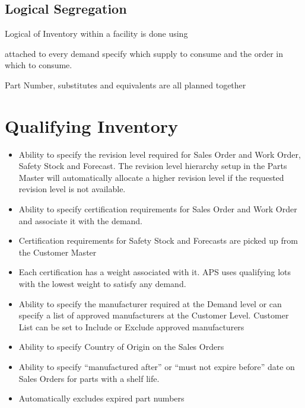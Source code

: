 \documentclass[letterpaper,10pt,english]{sphinxmanual}
\begin{document}
\subsection{Logical Segregation}
\label{\detokenize{index:logical-segregation}}
Logical of Inventory within a facility is done using 

 attached to every demand specify which supply to consume
and the order in which to consume.

Part Number, substitutes and equivalents are all planned together


\section{Qualifying Inventory}
\label{\detokenize{index:qualifying-inventory}}\begin{itemize}
\item {} 
Ability to specify the revision level required for Sales Order and
Work Order, Safety Stock and Forecast. The revision level hierarchy
setup in the Parts Master will automatically allocate a higher
revision level if the requested revision level is not available.

\item {} 
Ability to specify certification requirements for Sales Order and
Work Order and associate it with the demand.

\item {} 
Certification requirements for Safety Stock and Forecasts are picked
up from the Customer Master

\item {} 
Each certification has a weight associated with it. APS uses
qualifying lots with the lowest weight to satisfy any demand.

\item {} 
Ability to specify the manufacturer required at the Demand level or
can specify a list of approved manufacturers at the Customer Level.
Customer List can be set to Include or Exclude approved
manufacturers

\item {} 
Ability to specify Country of Origin on the Sales Orders

\item {} 
Ability to specify “manufactured after” or “must not expire before”
date on Sales Orders for parts with a shelf life.

\item {} 
Automatically excludes expired part numbers


\end{itemize}
\end{document}
